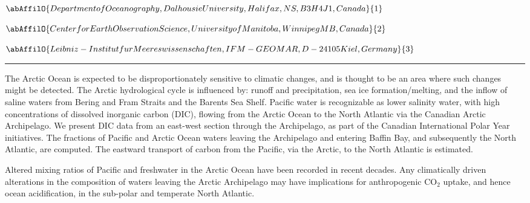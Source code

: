\begin{minipage}{\linewidth}\begin{center}\begin{minipage}{\linewidth}
   \vspace{2 mm} \begin{center}
    \vspace{2 mm}\begin{center}
  
  $\abAffilO{Department of Oceanography, Dalhousie University, Halifax, NS, B3H 4J1, Canada}{1}$

  
  $\abAffilO{Center for Earth Observation Science, University of Manitoba, Winnipeg MB, Canada}{2}$

  
  $\abAffilO{Leibniz-Institut fur Meereswissenschaften, IFM-GEOMAR, D-24105 Kiel, Germany}{3}$

  \end{center}
  \vspace{2 mm}
  \end{center}\end{minipage}\end{center}
  \begin{center}\rule{0.70\linewidth}{0.5 pt}\end{center}
  \begin{minipage}{\linewidth}
\noindent The Arctic Ocean is expected to be disproportionately sensitive to climatic changes, and is thought to be an area where such changes might be detected. The Arctic hydrological cycle is influenced by: runoff and precipitation, sea ice formation/melting, and the inflow of saline waters from Bering and Fram Straits and the Barents Sea Shelf.  Pacific water is recognizable as lower salinity water, with high concentrations of dissolved inorganic carbon (DIC), flowing from the Arctic Ocean to the North Atlantic via the Canadian Arctic Archipelago. 
We present DIC data from an east-west section through the Archipelago, as part of the Canadian International Polar Year initiatives. The fractions of Pacific and Arctic Ocean waters leaving the Archipelago and entering Baffin Bay, and subsequently the North Atlantic, are computed. The eastward transport of carbon from the Pacific, via the Arctic, to the North Atlantic is estimated. 

Altered mixing ratios of Pacific and freshwater in the Arctic Ocean have been recorded in recent decades. Any climatically driven alterations in the composition of waters leaving the Arctic Archipelago may have implications for anthropogenic CO$_2$ uptake, and hence ocean acidification, in the sub-polar and temperate North Atlantic.
\end{minipage}\end{minipage}
